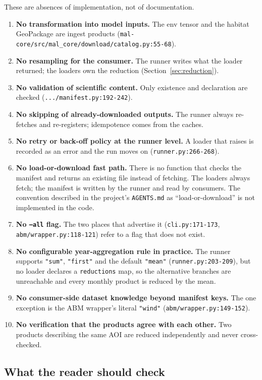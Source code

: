 \documentclass[11pt,a4paper]{article}
\newcommand{\code}[1]{\texttt{#1}}
\begin{document}
These are absences of implementation, not of documentation.

\begin{enumerate}
\item \textbf{No transformation into model inputs.} The env tensor and the
habitat GeoPackage are ingest products
(\code{mal-core/src/mal\_core/download/catalog.py:55-68}).
\item \textbf{No resampling for the consumer.} The runner writes what the
loader returned; the loaders own the reduction
(Section~\ref{sec:reduction}).
\item \textbf{No validation of scientific content.} Only existence and
declaration are checked (\code{.../manifest.py:192-242}).
\item \textbf{No skipping of already-downloaded outputs.} The runner always
re-fetches and re-registers; idempotence comes from the caches.
\item \textbf{No retry or back-off policy at the runner level.} A loader that
raises is recorded as an error and the run moves on
(\code{runner.py:266-268}).
\item \textbf{No load-or-download fast path.} There is no function that
checks the manifest and returns an existing file instead of fetching. The
loaders always fetch; the manifest is written by the runner and read by
consumers. The convention described in the project's \code{AGENTS.md} as
``load-or-download'' is not implemented in the code.
\item \textbf{No \code{--all} flag.} The two places that advertise it
(\code{cli.py:171-173}, \code{abm/wrapper.py:118-121}) refer to a flag that
does not exist.
\item \textbf{No configurable year-aggregation rule in practice.} The runner
supports \code{"sum"}, \code{"first"} and the default \code{"mean"}
(\code{runner.py:203-209}), but no loader declares a \code{reductions} map,
so the alternative branches are unreachable and every monthly product is
reduced by the mean.
\item \textbf{No consumer-side dataset knowledge beyond manifest keys.} The
one exception is the ABM wrapper's literal \code{"wind"}
(\code{abm/wrapper.py:149-152}).
\item \textbf{No verification that the products agree with each other.} Two
products describing the same AOI are reduced independently and never
cross-checked.
\end{enumerate}

\subsection{What the reader should check}
\end{document}
